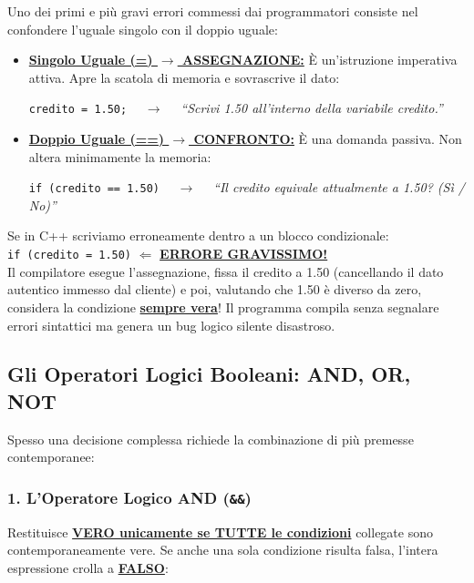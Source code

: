 \begin{attenzione}
Uno dei primi e più gravi errori commessi dai programmatori consiste nel confondere l'uguale singolo con il doppio uguale:
\begin{itemize}
  \item \textbf{\underline{Singolo Uguale (=) $\to$ ASSEGNAZIONE:}} È un'istruzione imperativa attiva. Apre la scatola di memoria e sovrascrive il dato:
  \begin{center}
  \texttt{credito = 1.50;} $\quad\longrightarrow\quad$ \emph{``Scrivi 1.50 all'interno della variabile credito.''}
  \end{center}
  \item \textbf{\underline{Doppio Uguale (==) $\to$ CONFRONTO:}} È una domanda passiva. Non altera minimamente la memoria:
  \begin{center}
  \texttt{if (credito == 1.50)} $\quad\longrightarrow\quad$ \emph{``Il credito equivale attualmente a 1.50? (Sì / No)''}
  \end{center}
\end{itemize}

\vspace{0.5em}
\noindent Se in C++ scriviamo erroneamente dentro a un blocco condizionale:\\
\texttt{if (credito = 1.50)} \quad $\Longleftarrow$ \textbf{\underline{ERRORE GRAVISSIMO!}}\\
Il compilatore esegue l'assegnazione, fissa il credito a 1.50 (cancellando il dato autentico immesso dal cliente) e poi, valutando che 1.50 è diverso da zero, considera la condizione \textbf{\underline{sempre vera}}! Il programma compila senza segnalare errori sintattici ma genera un bug logico silente disastroso.
\end{attenzione}

\subsection{Gli Operatori Logici Booleani: AND, OR, NOT}

Spesso una decisione complessa richiede la combinazione di più premesse contemporanee:

\subsubsection{1. L'Operatore Logico AND (\texttt{\&\&})}
Restituisce \textbf{\underline{VERO unicamente se TUTTE le condizioni}} collegate sono contemporaneamente vere. Se anche una sola condizione risulta falsa, l'intera espressione crolla a \textbf{\underline{FALSO}}:

